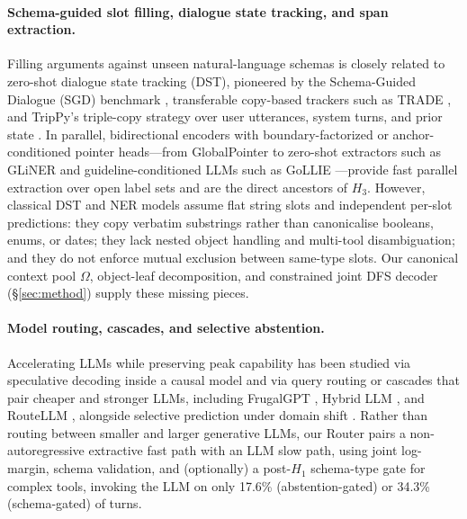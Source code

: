 \paragraph{Schema-guided slot filling, dialogue state tracking, and span extraction.}
Filling arguments against unseen natural-language schemas is closely related to zero-shot dialogue state tracking (DST), pioneered by the Schema-Guided Dialogue (SGD) benchmark \citep{rastogi2020sgd}, transferable copy-based trackers such as TRADE \citep{wu2019trade}, and TripPy's triple-copy strategy over user utterances, system turns, and prior state \citep{heck2020trippy}. In parallel, bidirectional encoders \citep{devlin2019bert,warner2024modernbert} with boundary-factorized or anchor-conditioned pointer heads---from GlobalPointer \citep{su2022globalpointer} to zero-shot extractors such as GLiNER \citep{zaratiana2024gliner} and guideline-conditioned LLMs such as GoLLIE \citep{sainz2024gollie}---provide fast parallel extraction over open label sets and are the direct ancestors of $H_3$. However, classical DST and NER models assume flat string slots and independent per-slot predictions: they copy verbatim substrings rather than canonicalise booleans, enums, or dates; they lack nested object handling and multi-tool disambiguation; and they do not enforce mutual exclusion between same-type slots. Our canonical context pool $\Omega$, object-leaf decomposition, and constrained joint DFS decoder (\S\ref{sec:method}) supply these missing pieces.

\paragraph{Model routing, cascades, and selective abstention.}
Accelerating LLMs while preserving peak capability has been studied via speculative decoding inside a causal model \citep{leviathan2023speculative} and via query routing or cascades that pair cheaper and stronger LLMs, including FrugalGPT \citep{chen2024frugalgpt}, Hybrid LLM \citep{ding2024hybrid}, and RouteLLM \citep{ong2025routellm}, alongside selective prediction under domain shift \citep{kamath2020selective}. Rather than routing between smaller and larger generative LLMs, our Router pairs a non-autoregressive extractive fast path with an LLM slow path, using joint log-margin, schema validation, and (optionally) a post-$H_1$ schema-type gate for complex tools, invoking the LLM on only 17.6\% (abstention-gated) or 34.3\% (schema-gated) of turns.
